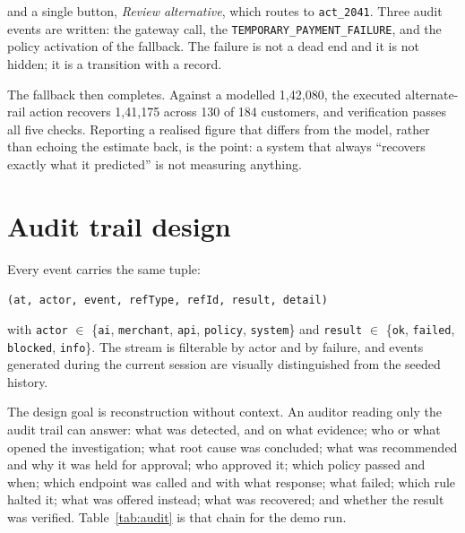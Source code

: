 \documentclass[10pt,twocolumn,a4paper]{article}
\newcommand{\rs}{\rupee}%
\newcommand{\rs}{\textrm{INR}\,}%
\newcommand{\code}[1]{\texttt{\small #1}}
\begin{document}
and a single button, \emph{Review alternative}, which routes to
\code{act\_2041}. Three audit events are written: the gateway call, the
\code{TEMPORARY\_PAYMENT\_FAILURE}, and the policy activation of the fallback.
The failure is not a dead end and it is not hidden; it is a transition with a
record.

The fallback then completes. Against a modelled \rs{}1{,}42{,}080, the executed
alternate-rail action recovers \rs{}1{,}41{,}175 across 130 of 184 customers, and
verification passes all five checks. Reporting a realised figure that differs
from the model, rather than echoing the estimate back, is the point: a system
that always ``recovers exactly what it predicted'' is not measuring anything.

\section{Audit trail design}
\label{sec:audit}

Every event carries the same tuple:

\begin{center}\small
\code{(at, actor, event, refType, refId, result, detail)}
\end{center}

with \code{actor} $\in$ \{\code{ai}, \code{merchant}, \code{api}, \code{policy},
\code{system}\} and \code{result} $\in$ \{\code{ok}, \code{failed},
\code{blocked}, \code{info}\}. The stream is filterable by actor and by failure,
and events generated during the current session are visually distinguished from
the seeded history.

The design goal is reconstruction without context. An auditor reading only the
audit trail can answer: what was detected, and on what evidence; who or what
opened the investigation; what root cause was concluded; what was recommended and
why it was held for approval; who approved it; which policy passed and when;
which endpoint was called and with what response; what failed; which rule halted
it; what was offered instead; what was recovered; and whether the result was
verified. Table~\ref{tab:audit} is that chain for the demo run.
\end{document}

